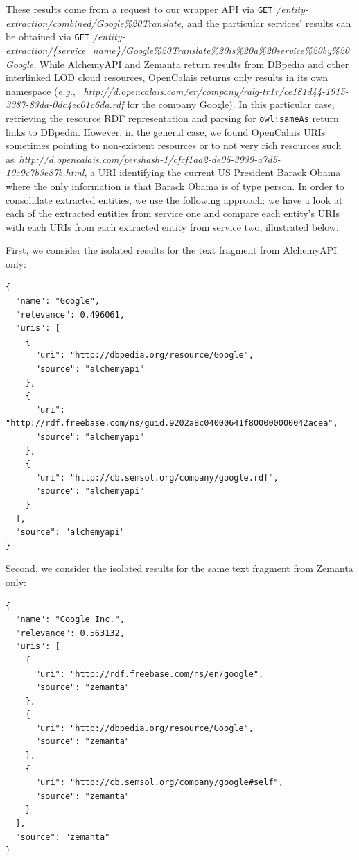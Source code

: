 \documentclass[twocolumn]{article}
\newcommand{\nofootnote}[1]{~#1}
\begin{document}
These results come from a request to our wrapper API via \texttt{GET} \textit{/entity-extraction/combined/Google\%20Translate},
and the particular services' results can be obtained via \texttt{GET} \textit{/entity-extraction/\{service\_name\}/Google\%20Translate\%20is\%20a\%20service\%20by\%20Google}.
While AlchemyAPI and Zemanta return results from DBpedia and other interlinked LOD cloud resources, OpenCalais returns
only results in its own namespace
(\emph{e.g.}, \nofootnote{\textit{http://d.opencalais.com/er/company/ralg-tr1r/ce181d44-1915-3387-83da-0dc4ec01c6da.rdf}} for the
company Google). In this particular case, retrieving the resource RDF representation and parsing for
\texttt{owl:sameAs} return links to DBpedia. However, in the general case, we found OpenCalais URIs sometimes pointing
to non-existent resources or to not very rich resources such
as\nofootnote{\textit{http://d.opencalais.com/pershash-1/cfcf1aa2-de05-3939-a7d5-10c9c7b3e87b.html}}, a URI identifying
the current US President Barack Obama where the only information is that Barack Obama is of type person. In order to
consolidate extracted entities, we use the following approach: we have a look at each of the extracted entities from
service one and compare each entity's URIs with each URIs from each extracted entity from service two, illustrated below.

First, we consider the isolated results for the text fragment from AlchemyAPI only:
\begin{lstlisting}
{
  "name": "Google",
  "relevance": 0.496061,
  "uris": [
    {
      "uri": "http://dbpedia.org/resource/Google",
      "source": "alchemyapi"
    },
    {
      "uri": "http://rdf.freebase.com/ns/guid.9202a8c04000641f800000000042acea",
      "source": "alchemyapi"
    },
    {
      "uri": "http://cb.semsol.org/company/google.rdf",
      "source": "alchemyapi"
    }
  ],
  "source": "alchemyapi"
}
\end{lstlisting}

Second, we consider the isolated results for the same text fragment from Zemanta only:
\begin{lstlisting}
{
  "name": "Google Inc.",
  "relevance": 0.563132,
  "uris": [
    {
      "uri": "http://rdf.freebase.com/ns/en/google",
      "source": "zemanta"
    },
    {
      "uri": "http://dbpedia.org/resource/Google",
      "source": "zemanta"
    },
    {
      "uri": "http://cb.semsol.org/company/google#self",
      "source": "zemanta"
    }
  ],
  "source": "zemanta"
}
\end{lstlisting}
\end{document}
